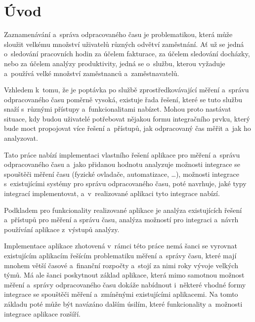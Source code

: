 
\graphicspath{ {./images} }

\chapter*{Úvod}
\setcounter{page}{1}

Zaznamenávání a~správa odpracovaného času je problematikou, která může sloužit velkému množství uživatelů různých odvětví zaměstnání. Ať už se jedná o~sledování pracovních hodin za účelem fakturace, za účelem sledování docházky, nebo za účelem analýzy produktivity, jedná se o~službu, kterou vyžaduje a~používá velké množství zaměstnanců a~zaměstnavatelů.

Vzhledem k~tomu, že je poptávka po službě zprostředkovávající měření a~správu odpracovaného času poměrně vysoká, existuje řada řešení, které se tuto službu snaží s~různými přístupy a~funkcionalitami nabízet. Mohou proto nastávat situace, kdy budou uživatelé potřebovat nějakou formu integračního prvku, který bude moct propojovat více řešení a~přístupů, jak odpracovaný čas měřit a~jak ho analyzovat. 

Tato práce nabízí implementaci vlastního řešení aplikace pro měření a~správu odpracovaného času a~jako přidanou hodnotu analyzuje možnosti integrace se spouštěči měření času (fyzické ovladače, automatizace, \dots), možnosti integrace s~existujícími systémy pro správu odpracovaného času, poté navrhuje, jaké typy integrací implementovat, a~v~realizované aplikaci tyto integrace nabízí.

Podkladem pro funkcionality realizované aplikace je analýza existujících řešení a~přístupů pro měření a správu času, analýza možností pro integraci a~návrh používání aplikace z~výstupů analýzy.

Implementace aplikace zhotovená v~rámci této práce nemá šanci se vyrovnat existujícím aplikacím řešícím problematiku měření a~správy času, které mají mnohem větší časové a~finanční rozpočty a~stojí za nimi roky vývoje velkých týmů. Má ale šanci poskytnout základ aplikace, která mimo samotnou možnost měření a~správy odpracovaného času dokáže nabídnout i~některé vhodné formy integrace se spouštěči měření a~zmíněnými existujícími aplikacemi. Na tomto základu poté může být navázáno dalším úsilím, které funkcionality a~možnosti integrace aplikace rozšíří. 

